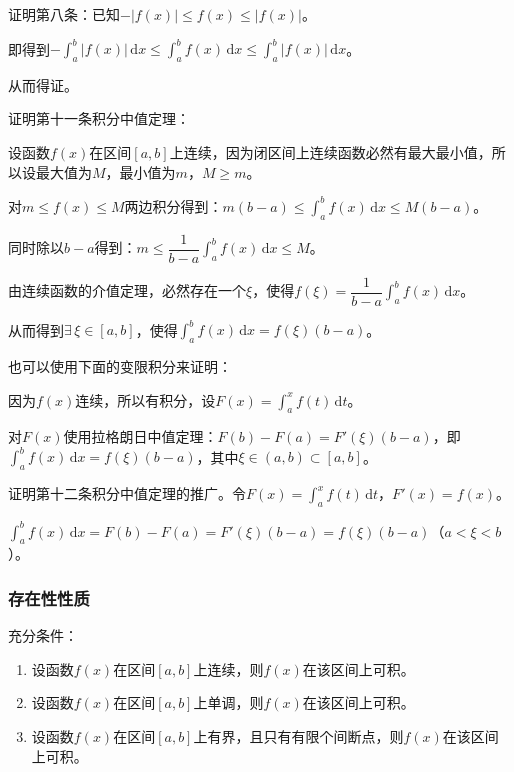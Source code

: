 \documentclass[UTF8, 12pt]{ctexart}
\begin{document}
        证明第八条：已知$-\vert f(x)\vert\leqslant f(x)\leqslant\vert f(x)\vert$。

        即得到$-\int_a^b\vert f(x)\vert\,\textrm{d}x\leqslant\int_a^bf(x)\,\textrm{d}x\leqslant\int_a^b\vert f(x)\vert\,\textrm{d}x$。

        从而得证。

        证明第十一条积分中值定理：

        设函数$f(x)$在区间$[a,b]$上连续，因为闭区间上连续函数必然有最大最小值，所以设最大值为$M$，最小值为$m$，$M\geqslant m$。

        对$m\leqslant f(x)\leqslant M$两边积分得到：$m(b-a)\leqslant\int_a^bf(x)\,\textrm{d}x\leqslant M(b-a)$。

        同时除以$b-a$得到：$m\leqslant\dfrac{1}{b-a}\int_a^bf(x)\,\textrm{d}x\leqslant M$。

        由连续函数的介值定理，必然存在一个$\xi$，使得$f(\xi)=\dfrac{1}{b-a}\int_a^bf(x)\,\textrm{d}x$。

        从而得到$\exists\,\xi\in[a,b]$，使得$\int_a^bf(x)\,\textrm{d}x=f(\xi)(b-a)$。

        也可以使用下面的变限积分来证明：

        因为$f(x)$连续，所以有积分，设$F(x)=\int_a^xf(t)\,\textrm{d}t$。

        对$F(x)$使用拉格朗日中值定理：$F(b)-F(a)=F'(\xi)(b-a)$，即$\int_a^bf(x)\,\textrm{d}x=f(\xi)(b-a)$，其中$\xi\in(a,b)\subset[a,b]$。

        证明第十二条积分中值定理的推广。令$F(x)=\int_a^xf(t)\,\textrm{d}t$，$F'(x)=f(x)$。

        $\int_a^bf(x)\,\textrm{d}x=F(b)-F(a)=F'(\xi)(b-a)=f(\xi)(b-a)$（$a<\xi<b$）。

        \subsubsection{存在性性质}

        充分条件：

        \begin{enumerate}
            \item 设函数$f(x)$在区间$[a,b]$上连续，则$f(x)$在该区间上可积。
            \item 设函数$f(x)$在区间$[a,b]$上单调，则$f(x)$在该区间上可积。
            \item 设函数$f(x)$在区间$[a,b]$上有界，且只有有限个间断点，则$f(x)$在该区间上可积。
        \end{enumerate}
\end{document}
